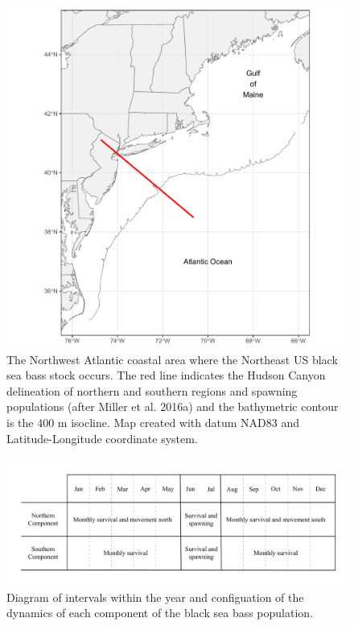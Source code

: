 \documentclass[
]{article}
\begin{document}
\begin{figure}

{\centering \includegraphics[width=1\linewidth]{map} 

}

\caption{The Northwest Atlantic coastal area where the Northeast US black sea bass stock occurs. The red line indicates the Hudson Canyon delineation of northern and southern regions and spawning populations (after Miller et al. 2016a) and the bathymetric contour is the 400 m isocline. Map created with datum NAD83 and Latitude-Longitude coordinate system.}\label{fig:map}
\end{figure}
\pagebreak

\begin{figure}

{\centering \includegraphics[width=0.8\linewidth]{bsb_movement_diagram} 

}

\caption{Diagram of intervals within the year and configuation of the dynamics of each component of the black sea bass population.}\label{fig:migration-diagram}
\end{figure}
\pagebreak
\end{document}
